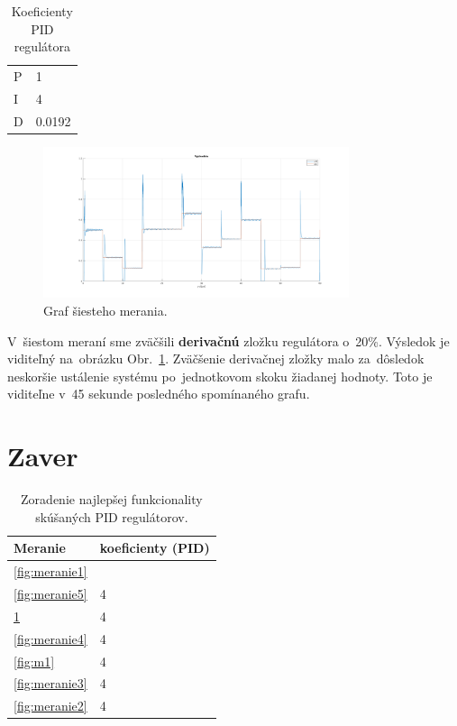 \documentclass{article}
\begin{document}
\begin{table}[!htbp]
	\caption{Koeficienty PID regulátora}
	\label{tab:t6}
	\begin{center}
		\begin{tabular}[c]{|l|l|}
			\hline
			P & 1 \\
			I & 4 \\
			D & 0.0192 \\
			\hline
		\end{tabular}
	\end{center}
\end{table}

\begin{figure}[!htbp]
	\begin{center}
		\includegraphics[width=0.8\textwidth]{./include/m7.png}
	\end{center}
	\caption{Graf šiesteho merania.}
	\label{fig:meranie6}
\end{figure}

V~šiestom meraní sme zväčšili \textbf{derivačnú} zložku regulátora o~20\%. Výsledok je viditeľný
na~obrázku Obr.~\ref{fig:meranie6}. Zväčšenie derivačnej zložky malo za~dôsledok neskoršie
ustálenie systému po~jednotkovom skoku žiadanej hodnoty. Toto je viditeľne v~45 sekunde posledného
spomínaného grafu.

\section{Zaver}
\label{sec:zaver}


\begin{table}[!htbp]
	\caption{Zoradenie najlepšej funkcionality skúšaných PID regulátorov.}
	\label{tab:zaver}
	\begin{center}
		\begin{tabular}[c]{|l|l|}
			\hline
			Meranie & koeficienty (PID) \\
			\hline
			\ref{fig:meranie1} &  \\
			\ref{fig:meranie5} & 4 \\
			\ref{fig:meranie6} & 4 \\
			\ref{fig:meranie4} & 4 \\
			\ref{fig:m1} & 4 \\
			\ref{fig:meranie3} & 4 \\
			\ref{fig:meranie2} & 4 \\
			\hline
		\end{tabular}
	\end{center}
\end{table}
\end{document}
